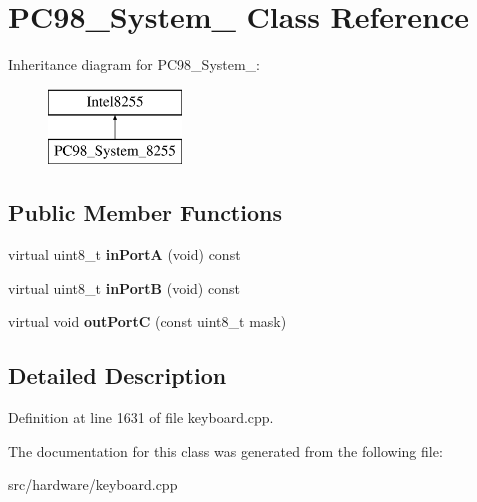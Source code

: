 \hypertarget{classPC98__System__8255}{\section{P\-C98\-\_\-\-System\-\_ Class Reference}
\label{classPC98__System__8255}
}
Inheritance diagram for P\-C98\-\_\-\-System\-\_\-:\begin{figure}[H]
\begin{center}
\leavevmode
\includegraphics[height=2.000000cm]{classPC98__System__8255}
\end{center}
\end{figure}
\subsection*{Public Member Functions}
\begin{DoxyCompactItemize}
\item 
\hypertarget{classPC98__System__8255_a75fbaf4c6f1de6a5a4680f6e9ddfef48}{virtual uint8\-\_\-t {\bfseries in\-Port\-A} (void) const }\label{classPC98__System__8255_a75fbaf4c6f1de6a5a4680f6e9ddfef48}

\item 
\hypertarget{classPC98__System__8255_ac40439f86eb00db1563e9c8fedab3dd3}{virtual uint8\-\_\-t {\bfseries in\-Port\-B} (void) const }\label{classPC98__System__8255_ac40439f86eb00db1563e9c8fedab3dd3}

\item 
\hypertarget{classPC98__System__8255_a273039abe8a3f459c2fe5937cc145f39}{virtual void {\bfseries out\-Port\-C} (const uint8\-\_\-t mask)}\label{classPC98__System__8255_a273039abe8a3f459c2fe5937cc145f39}

\end{DoxyCompactItemize}


\subsection{Detailed Description}


Definition at line 1631 of file keyboard.\-cpp.



The documentation for this class was generated from the following file\-:\begin{DoxyCompactItemize}
\item 
src/hardware/keyboard.\-cpp\end{DoxyCompactItemize}
